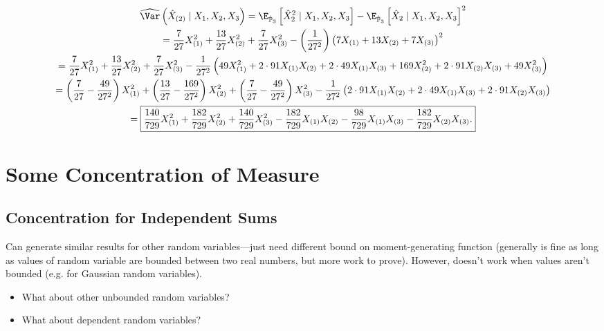 \begin{solution}
\begin{enumerate}[(a)]
\begin{multline*}
\widehat{\Var} \left(\hat{X}_{(2)}  \mid X_1, X_2, X_3 \right)   = \E_{\hat{\mathbb{P}}_3} \left[ \hat{X}_2^2   \mid X_1, X_2, X_3 \right] - \E_{\hat{\mathbb{P}}_3} \left[ \hat{X}_2   \mid X_1, X_2, X_3 \right] ^2
\\ =  \frac{7}{27} X_{(1)}^2 + \frac{13}{27} X_{(2)}^2 + \frac{7}{27} X_{(3)}^2 - \left(\frac{1}{27^2} \right) \left( 7 X_{(1)} + 13 X_{(2)} +7 X_{(3)}\right)^2
\\ =  \frac{7}{27} X_{(1)}^2 + \frac{13}{27} X_{(2)}^2 + \frac{7}{27} X_{(3)}^2 - \frac{1}{27^2}  \left( 49 X_{(1)}^2 + 2 \cdot 91  X_{(1)}X_{(2)} + 2 \cdot 49 X_{(1)} X_{(3)}+ 169 X_{(2)}^2 +2 \cdot 91 X_{(2)} X_{(3)} + 49 X_{(3)}^2\right)
\\ =  \left( \frac{7}{27} - \frac{49}{27^2}  \right) X_{(1)}^2 + \left( \frac{13}{27} - \frac{169}{27^2} \right) X_{(2)}^2 + \left( \frac{7}{27} - \frac{49}{27^2} \right) X_{(3)}^2 - \frac{1}{27^2}  \left(  2 \cdot 91  X_{(1)}X_{(2)} + 2 \cdot 49 X_{(1)} X_{(3)} +2 \cdot 91 X_{(2)} X_{(3)} \right)
\\ = \boxed{ \frac{140}{729} X_{(1)}^2 + \frac{182}{729}  X_{(2)}^2 +  \frac{140}{729}X_{(3)}^2 - \frac{182}{729} X_{(1)}X_{(2)} - \frac{98}{729} X_{(1)} X_{(3)}    - \frac{182}{729} X_{(2)} X_{(3)}.}
\end{multline*}

\end{enumerate}

\end{solution}

\section{Some Concentration of Measure}

\subsection{Concentration for Independent Sums}

Can generate similar results for other random variables---just need different bound on moment-generating function (generally is fine as long as values of random variable are bounded between two real numbers, but more work to prove). However, doesn't work when values aren't bounded (e.g. for Gaussian random variables).

\begin{itemize}

\item What about other unbounded random variables?

\item What about dependent random variables?

\end{itemize}

